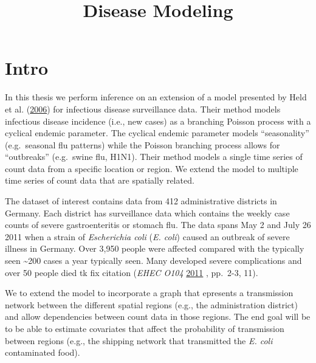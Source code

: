 \documentclass[11pt,a4paper]{article}
\title{Disease Modeling}
\author{}
\date{}
\numberwithin{equation}{section}
\begin{document}
\maketitle

\newcommand{\dw}[1]{{\color{red}{#1}}}

\hypertarget{intro}{%
\section{Intro}\label{intro}}

In this thesis we perform inference on an extension of a model presented
by Held et al. (\protect\hyperlink{ref-held_two-component_2006}{2006})
for infectious disease surveillance data. Their method models infectious
disease incidence (i.e., new cases) as a branching Poisson process with
a cyclical endemic parameter. The cyclical endemic parameter models
``seasonality'' (e.g.~seasonal flu patterns) while the Poisson branching
process allows for ``outbreaks'' (e.g.~swine flu, H1N1). Their method
models a single time series of count data from a specific location or
region. We extend the model to multiple time series of count data that
are spatially related.

The dataset of interest contains data from 412 administrative districts
in Germany. Each district has surveillance data which contains the
weekly case counts of severe gastroenteritis or stomach flu. The data
spans May 2 and July 26 2011 when a strain of \emph{Escherichia coli}
(\emph{E. coli}) caused an outbreak of severe illness in Germany. Over
3,950 people were affected compared with the typically seen
\textasciitilde{}200 cases a year typically seen. Many developed severe
complications and over 50 people died tk fix citation (\emph{EHEC O104}
\protect\hyperlink{ref-noauthor_ehec_2011}{2011} , pp.~2-3, 11).

We to extend the model to incorporate a graph that epresents a
transmission network between the different spatial regions (e.g., the
administration district) and allow dependencies between count data in
those regions. The end goal will be to be able to estimate covariates
that affect the probability of transmission between regions (e.g., the
shipping network that transmitted the \emph{E. coli} contaminated food).
\end{document}
